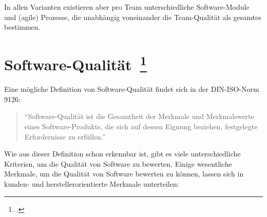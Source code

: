 In allen Varianten existieren aber pro Team unterschiedliche Software-Module und (agile) Prozesse, die unabhängig voneinander die Team-Qualität als gesamtes bestimmen.

\clearpage
\section[Software-Qualität]{Software-Qualität~\footcite[vgl.][Kapitel 1.2]{hoffmann_software_qualitat_2013}}

Eine mögliche Definition von Software-Qualität findet sich in der DIN-ISO-Norm 9126:

\begin{quote}
  ``Software-Qualität ist die Gesamtheit der Merkmale und Merkmalswerte eines Software-Produkts, die sich auf dessen Eignung beziehen, festgelegte Erfordernisse zu erfüllen.''
\end{quote}

Wie aus dieser Definition schon erkennbar ist, gibt es viele unterschiedliche Kriterien, um die Qualität von Software zu bewerten.
Einige wesentliche Merkmale, um die Qualität von Software bewerten zu können, lassen sich in kunden- und herstellerorientierte Merkmale unterteilen:

